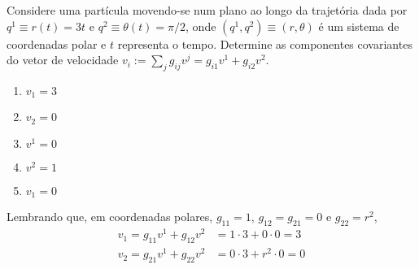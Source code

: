 \begin{question}
    Considere uma partícula movendo-se num plano ao longo da trajetória dada por $q^1 \equiv r(t) = 3t$ e $q^2 \equiv \theta(t) = \pi/2$, onde $(q^1, q^2) \equiv (r,\theta)$ é um sistema de coordenadas polar e $t$ representa o tempo.
    Determine as componentes covariantes do vetor de velocidade $v_i := \sum_{j} g_{ij} v^j = g_{i1} v^1 + g_{i2} v^2$.
    \begin{enumerate}
      \item $v_1 = 3$ \rightanswer
      \item $v_2 = 0$ \rightanswer
      \item $v^1 = 0$
      \item $v^2 = 1$
      \item $v_1 = 0$
    \end{enumerate}

    \begin{solution}
      Lembrando que, em coordenadas polares, $g_{11} = 1$, $g_{12} = g_{21} = 0$ e $g_{22} = r^2$,
      \begin{align*}
        v_1 = g_{11} v^1 + g_{12} v^2 &= 1 \cdot 3 + 0 \cdot 0 = 3 \\
        v_2 = g_{21} v^1 + g_{22} v^2 &= 0 \cdot 3 + r^2 \cdot 0 = 0
      \end{align*}
    \end{solution}
\end{question}